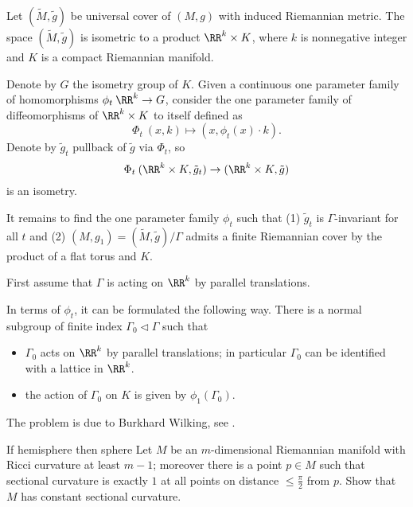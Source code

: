 Let $(\tilde M,\tilde g)$ be universal cover of $(M,g)$ with induced Riemannian metric.
The space $(\tilde M,\tilde g)$ is isometric to a product $\RR^k\times K$, 
where $k$ is nonnegative integer and $K$ is a compact Riemannian manifold.

Denote by $G$ the isometry group of $K$.
Given a continuous one parameter family of homomorphisms $\phi_t\:\RR^k\to G$,
consider the one parameter family of diffeomorphisms of $\RR^k\times K$ to itself defined as
\[\Phi_t\:(x,k)\mapsto (x,\phi_t(x)\cdot k).\]
Denote by 
 $\tilde g_t$ pullback 
of $\tilde g$ via $\Phi_t$,
so 
\[\Phi_t\:(\RR^k\times K,\tilde g_t)\to (\RR^k\times K,\tilde g)\]
is an isometry.

It remains to find the one parameter family $\phi_t$ such that 
(1) $\tilde g_t$ is $\Gamma$-invariant for all $t$
and (2) $(M,g_1)=(\tilde M,\tilde g)/\Gamma$ admits a finite Riemannian cover by the product of a flat torus and $K$.

First assume that $\Gamma$ is acting on $\RR^k$ by parallel translations.
 




In terms of $\phi_t$, it can be formulated the following way.
There is a normal subgroup of finite index $\Gamma_0\vartriangleleft\Gamma$ such that 
\begin{itemize}
\item $\Gamma_0$ acts on $\RR^k$ by parallel translations; 
in particular $\Gamma_0$ can be identified with a lattice in $\RR^k$.
\item the action of $\Gamma_0$ on $K$ is given by $\phi_1(\Gamma_0)$.
\end{itemize}


The problem is due to Burkhard Wilking, see \cite{wilking-2000}.














\begin{pr}{\thm}{If hemisphere then sphere}\label{hS=>S} 
Let $M$ be an $m$-dimensional Riemannian manifold with Ricci curvature at least $m-1$;
moreover there is a point $p\in M$ such that sectional curvature is exactly $1$ at all points on distance $\le \tfrac\pi2$ from $p$.
Show that $M$ has constant sectional curvature.
\end{pr}

